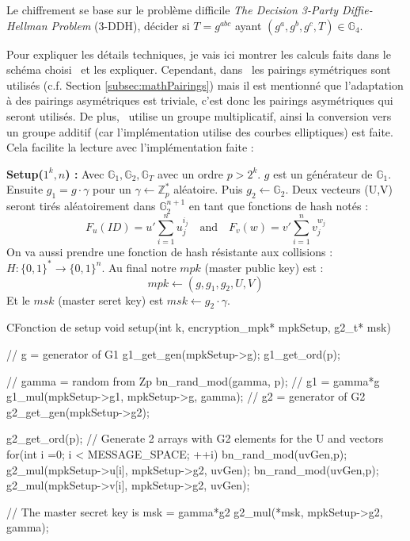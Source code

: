 Le chiffrement se base sur le problème difficile \textit{The Decision 3-Party Diffie-Hellman Problem} (3-DDH), décider si $T =g^{abc}$ ayant $(g^a, g^b, g^c, T) \in \mathbb{G}_4$.

Pour expliquer les détails techniques, je vais ici montrer les calculs faits dans le schéma choisi~\cite{conf/pkc/DentLP08} et les expliquer. Cependant, dans~\cite{conf/pkc/DentLP08} les pairings symétriques sont utilisés (c.f. Section \ref{subsec:mathPairings}) mais il est mentionné que l'adaptation à des pairings asymétriques est triviale, c'est donc les pairings asymétriques qui seront utilisés. De plus,~\cite{conf/pkc/DentLP08} utilise un groupe multiplicatif, ainsi la conversion vers un groupe additif (car l'implémentation utilise des courbes elliptiques) est faite. Cela facilite la lecture avec l'implémentation faite :

\textbf{Setup($1^k, n$) :} Avec $\mathbb{G}_1, \mathbb{G}_2, \mathbb{G}_T$ avec un ordre $p > 2^k$. $g$ est un générateur de $\mathbb{G}_1$. Ensuite  $g_1 = g \cdot \gamma$ pour un $\gamma \leftarrow  \mathbb{Z}_p^*$ aléatoire. Puis $g_2 \leftarrow \mathbb{G}_2$. Deux vecteurs (U,V) seront tirés aléatoirement dans $\mathbb{G}_2^{n+1}$ en tant que fonctions de hash notés :
\[F_u(ID) = u' \sum_{i=1}^{n} u_j^{i_j}\quad\mathrm{and}\quad F_v(w) = v' \sum_{i=1}^{n} v_j^{w_j}\]
On va aussi prendre une fonction de hash résistante aux collisions : $H : \{0,1\}^* \rightarrow \{0,1\}^n$. Au final notre $mpk$ (master public key) est :
\[mpk \leftarrow (g, g_1, g_2, U, V)\]
Et le $msk$ (master seret key) est $msk \leftarrow g_2 \cdot \gamma$.

\begin{sourcebox}{C}{Fonction de setup}
	void setup(int k, encryption_mpk* mpkSetup, g2_t* msk){
		// g = generator of G1
		g1_get_gen(mpkSetup->g);
		g1_get_ord(p);
		
		// gamma = random from Zp
		bn_rand_mod(gamma, p);
		// g1 = gamma*g
		g1_mul(mpkSetup->g1, mpkSetup->g, gamma);
		// g2 = generator of G2
		g2_get_gen(mpkSetup->g2);
		
		g2_get_ord(p);
		// Generate 2 arrays with G2 elements for the U and  vectors
		for(int i =0; i < MESSAGE_SPACE; ++i){
			bn_rand_mod(uvGen,p);
			g2_mul(mpkSetup->u[i], mpkSetup->g2, uvGen);
			bn_rand_mod(uvGen,p);
			g2_mul(mpkSetup->v[i], mpkSetup->g2, uvGen);
		}
		
		// The master secret key is msk = gamma*g2
		g2_mul(*msk, mpkSetup->g2, gamma);
	}
\end{sourcebox}


